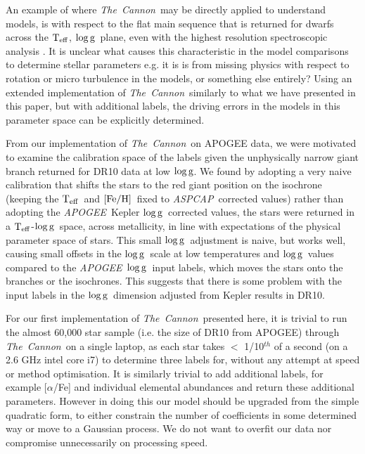 \documentclass[12pt, preprint]{aastex}
\newcommand{\teff}{\mbox{$\rm T_{eff}$}}
\newcommand{\feh}{\mbox{$\rm [Fe/H]$}}
\newcommand{\logg}{\mbox{$\rm \log g$}}
\newcommand{\tc}{\textsl{The~Cannon}}
\newcommand{\apogee}{\textsl{APOGEE}}
\newcommand{\aspcap}{\textsl{ASPCAP}}
\begin{document}
An example of where \tc\ may be directly applied to understand models, is with respect to the flat main sequence that is returned for dwarfs across the \teff, \logg\ plane, even with the highest resolution spectroscopic analysis \citep[e.g.][]{bensby2013}. It is unclear what causes this characteristic  in the model comparisons to determine stellar parameters e.g. it is is from missing physics with respect to rotation or micro turbulence in the models, or something else entirely? Using an extended implementation of \tc\ similarly to what we have presented in this paper, but with additional labels, the driving errors in the models in this parameter space can be explicitly determined.

From our implementation of \tc\ on APOGEE data, we were motivated to examine the calibration space of the labels given the unphysically narrow giant branch returned for DR10 data at low \logg. We found by adopting a very naive calibration that shifts the stars to the red giant position on the isochrone (keeping the \teff\ and \feh\ fixed to \aspcap\ corrected values) rather than adopting the \apogee\ Kepler \logg\ corrected values, the stars were returned in a \teff-\logg\ space, across metallicity, in line with expectations of the physical parameter space of stars. This small \logg\ adjustment is naive, but works well, causing small offsets in the \logg\ scale at low temperatures and \logg\ values compared to the \apogee\ \logg\ input labels, which moves the stars onto the branches or the isochrones. This suggests that there is some problem with the input labels in the \logg\ dimension adjusted from Kepler results in DR10. 

 For our first implementation of \tc\ presented here, it is trivial to run the almost 60,000 star sample (i.e. the size of DR10 from APOGEE) through \tc\ on a single laptop, as each star takes $<$ 1/10$^{th}$ of a second (on a 2.6 GHz intel core i7) to determine three labels for, without any attempt at speed or method optimisation. It is similarly trivial to add additional labels, for example [$\alpha$/Fe] and individual elemental abundances and return these additional parameters. However in doing this our model should be upgraded from the simple quadratic form, to either constrain the number of coefficients in some determined way or move to a Gaussian process. We do not want to overfit our data nor compromise unnecessarily on processing speed.  
 
\end{document}
